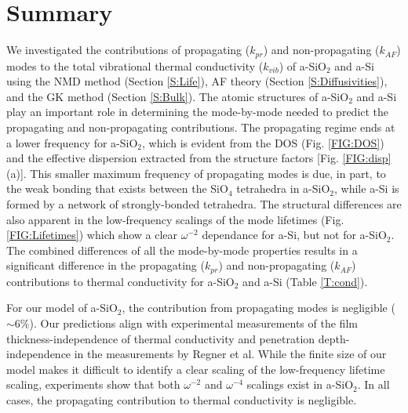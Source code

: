 \section{\label{S:Lifetimes}Summary}

We investigated the contributions of propagating ($k_{pr}$) 
and non-propagating ($k_{AF}$) modes to the total vibrational 
thermal conductivity ($k_{vib}$) of 
a-SiO$_2$ and a-Si using the NMD method (Section \ref{S:Life}),  
AF theory (Section \ref{S:Diffusivities}), and 
the GK method (Section \ref{S:Bulk}). 
The atomic structures of a-SiO$_2$ and a-Si play an important role 
in determining the mode-by-mode needed to predict the 
propagating and non-propagating contributions. The 
propagating regime ends at a lower frequency for a-SiO$_2$, which is 
evident from the DOS (Fig. \ref{FIG:DOS}) 
and the effective dispersion extracted from the structure factors 
[Fig. \ref{FIG:disp}(a)]. This smaller maximum frequency of 
propagating modes is due, in part, 
to the weak bonding that exists between the SiO$_4$ 
tetrahedra in a-SiO$_2$,
\cite{van_Beest_force_1990,kramer_interatomic_1991,
guissani_numerical_1996,mcgaughey_thermal_2004} 
while a-Si is formed by a network 
of strongly-bonded tetrahedra.
\cite{stillinger_computer_1985,biswas_vibrational_1988,
allen_diffusons_1999,barkema_high-quality_2000} 
The structural differences are also 
apparent in the low-frequency scalings of the mode lifetimes (Fig. 
\ref{FIG:Lifetimes}) which show a clear $\omega^{-2}$ dependance 
for a-Si, but not for a-SiO$_2$. The combined differences of all the 
mode-by-mode properties results in a significant difference 
in the propagating ($k_{pr}$) and non-propagating ($k_{AF}$) contributions 
to thermal conductivity for a-SiO$_2$ and a-Si (Table \ref{T:cond}). 

For our model of a-SiO$_2$, the contribution from propagating modes 
is negligible ($\sim$6$\%$). 
Our predictions align with experimental measurements of the film 
thickness-independence of thermal conductivity 
\cite{lee_heat_1997,yamane_measurement_2002} 
and penetration depth-independence in the measurements  
by Regner et al.\cite{regner_broadband_2013}
While the finite size 
of our model makes it difficult to identify a clear scaling 
of the low-frequency lifetime scaling, experiments show that 
both $\omega^{-2}$ and $\omega^{-4}$ scalings exist in 
a-SiO$_2$.\cite{masciovecchio_evidence_2006,baldi_sound_2010,
baldi_emergence_2013} In all cases, the propagating contribution to 
thermal conductivity is negligible.\cite{love_estimate_1990,
lee_heat_1997,yamane_measurement_2002,baldi_thermal_2008}

